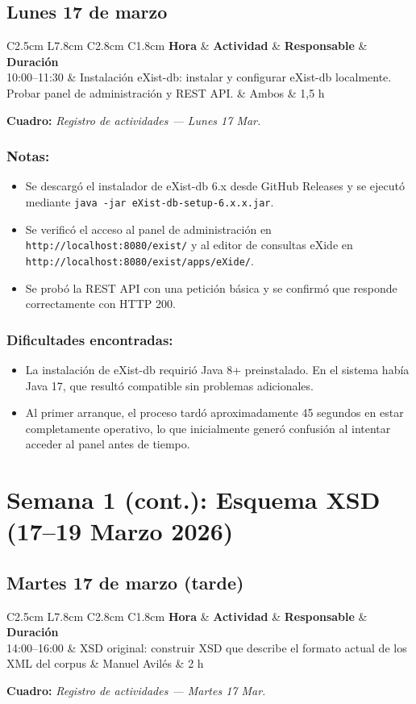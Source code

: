 \documentclass[11pt,a4paper]{article}
\newcommand{\notetitle}[1]{\subsubsection*{#1}}
\newcommand{\activitytable}[2]{%
  \begin{center}
  \begin{tabular}{C{2.5cm} L{7.8cm} C{2.8cm} C{1.8cm}}
  \toprule
  \rowcolor{white}
  \textbf{Hora} & \textbf{Actividad} & \textbf{Responsable} & \textbf{Duración} \\
  \midrule
  #1
  \bottomrule
  \end{tabular}
  \end{center}
  \vspace{-4pt}
  {\small\textbf{Cuadro:} \textit{#2}}
  \vspace{6pt}
}
\begin{document}
\subsection{Lunes 17 de marzo}

\activitytable{%
  10:00--11:30 & Instalación eXist-db: instalar y configurar eXist-db localmente. Probar panel de administración y REST API. & Ambos & 1,5 h \\
}{Registro de actividades --- Lunes 17 Mar.}

\notetitle{Notas:}
\begin{itemize}
  \item Se descargó el instalador de eXist-db 6.x desde GitHub Releases y se ejecutó mediante \texttt{java -jar eXist-db-setup-6.x.x.jar}.
  \item Se verificó el acceso al panel de administración en \texttt{http://localhost:8080/exist/} y al editor de consultas eXide en \texttt{http://localhost:8080/exist/apps/eXide/}.
  \item Se probó la REST API con una petición básica y se confirmó que responde correctamente con HTTP 200.
\end{itemize}

\notetitle{Dificultades encontradas:}
\begin{itemize}
  \item La instalación de eXist-db requirió Java 8+ preinstalado. En el sistema había Java 17, que resultó compatible sin problemas adicionales.
  \item Al primer arranque, el proceso tardó aproximadamente 45 segundos en estar completamente operativo, lo que inicialmente generó confusión al intentar acceder al panel antes de tiempo.
\end{itemize}

\newpage

\section{Semana 1 (cont.): Esquema XSD (17--19 Marzo 2026)}

\subsection{Martes 17 de marzo (tarde)}

\activitytable{%
  14:00--16:00 & XSD original: construir XSD que describe el formato actual de los XML del corpus & Manuel Avilés & 2 h \\
}{Registro de actividades --- Martes 17 Mar.}
\end{document}
